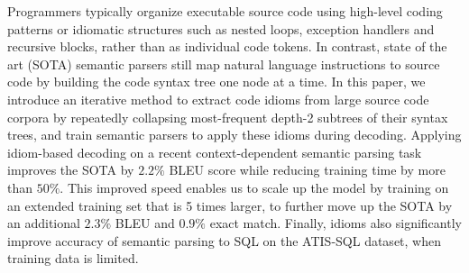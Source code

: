 Programmers typically organize executable source code using high-level coding patterns or idiomatic structures such as nested loops, exception handlers and recursive blocks, rather than as individual code tokens. In contrast, state of the art (SOTA) semantic parsers still map natural language instructions to source code by building the code syntax tree one node at a time. In this paper, we introduce an iterative method to extract code idioms from large source code corpora by repeatedly collapsing most-frequent depth-2 subtrees of their syntax trees, and train semantic parsers to apply these idioms during decoding. Applying idiom-based decoding on a recent context-dependent semantic parsing task improves the SOTA by $2.2\%$ BLEU score while reducing training time by more than $50\%$. This improved speed enables us to scale up the model by training on an extended training set that is 5 times larger, to further move up the SOTA by an additional $2.3\%$ BLEU and $0.9\%$ exact match. Finally, idioms also significantly improve accuracy of semantic parsing to SQL on the ATIS-SQL dataset, when training data is limited.